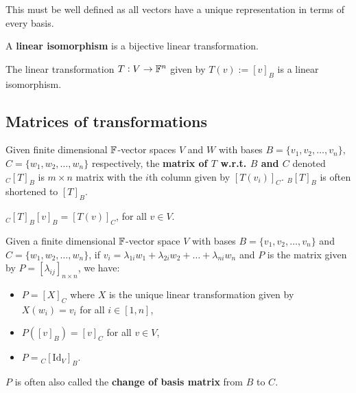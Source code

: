 \documentclass[../Year1.tex]{subfiles}
\begin{document}
\begin{remark}
    This must be well defined as all vectors have a unique representation in terms of every basis.
\end{remark}

\begin{definition}
    A \textbf{linear isomorphism} is a bijective linear transformation.
\end{definition}

\begin{theorem}
    The linear transformation $T:V\rightarrow\mathbb{F}^n$ given by $T(v):= [v]_B$ is a linear isomorphism.
\end{theorem}

\subsection{Matrices of transformations}
\begin{definition}
    Given finite dimensional $\mathbb{F}$-vector spaces $V$ and $W$ with bases $B = \{v_1,v_2,\ldots,v_n\}$, $C = \{w_1,w_2,\ldots,w_n\}$ respectively, the \textbf{matrix of $T$ w.r.t. $B$ and $C$} denoted $_C[T]_B$ is $m\times n$ matrix with the $i$th column given by $[T(v_i)]_C$. $_B[T]_B$ is often shortened to $[T]_B$.
\end{definition}

\begin{remark}
    $_C[T]_B[v]_B = [T(v)]_C$, for all $v\in V$.
\end{remark}

\begin{theorem}
    Given a finite dimensional $\mathbb{F}$-vector space $V$ with bases $B = \{v_1,v_2,\ldots,v_n\}$ and $C = \{w_1,w_2,\ldots,w_n\}$, if $v_i = \lambda_{1i}w_1 + \lambda_{2i}w_2 + \ldots + \lambda_{ni}w_n$ and $P$ is the matrix given by $P=[\lambda_{ij}]_{n\times n}$, we have: \begin{itemize}
        \item $P=[X]_C$ where $X$ is the unique linear transformation given by $X(w_i)=v_i$ for all $i\in[1,n]$,
        \item $P([v]_B) = [v]_C$ for all $v\in V$,
        \item $P= {}_C[\text{Id}_V]_B$.
    \end{itemize}
    $P$ is often also called the \textbf{change of basis matrix} from $B$ to $C$.
\end{theorem}
\end{document}
